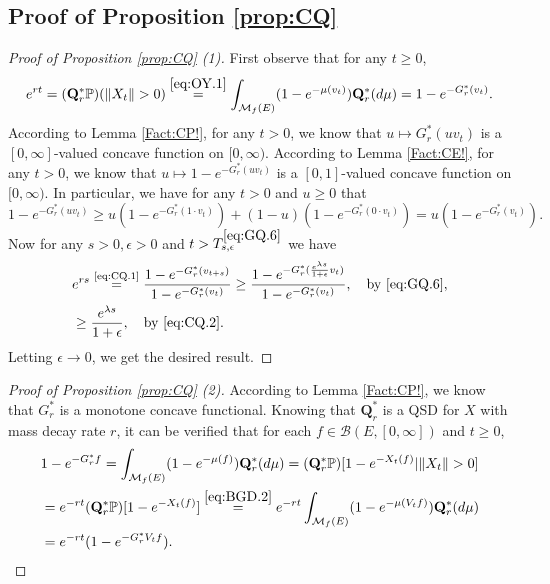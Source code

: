 \documentclass[12pt,a4paper]{amsart}
\numberwithin{equation}{section}
\theoremstyle{plain}
\theoremstyle{definition}
\theoremstyle{remark}
\begin{document}
\subsection{Proof of Proposition \ref{prop:CQ}} \label{sec:CQ}

\begin{proof}[Proof of Proposition \ref{prop:CQ} (1)]
	First observe that for any $t\geq 0$,
	\begin{equation} \label{eq:CQ.1}
	e^{rt} = (\mathbf Q_r^*\mathbb P)(\|X_t\|>0) 
	\overset{\eqref{eq:OY.1}}= \int_{\mathcal M_f(E)}  ( 1 - e^{-\mu(v_t)} ) \mathbf Q_r^*(d\mu)
	= 1 - e^{- G_r^*(v_t)}.
	\end{equation}
	According to Lemma \ref{Fact:CP!}, for any $t>0$, we know that $u\mapsto G_r^*(uv_t)$ is a $[0,\infty]$-valued concave function on $[0,\infty)$.
	According to Lemma \ref{Fact:CE!}, for any $t>0$, we know that $u \mapsto 1 - e^{- G_r^*(uv_t)}$ is a $[0,1]$-valued concave function on $[0, \infty)$.
	In particular, we have for any $t>0$ and $u \geq 0$ that
	\begin{equation} \label{eq:CQ.2}
		1 - e^{- G_r^*(uv_t)} \geq u(1 - e^{- G_r^*(1\cdot v_t)}) + (1-u) (1 - e^{- G_r^*(0 \cdot v_t)})  = u(1 - e^{- G_r^*(v_t)}).
	\end{equation}
	Now for any $s>0, \epsilon > 0$ and $t > T^{\eqref{eq:GQ.6}}_{s, \epsilon}$ we have
	\begin{align}
	& e^{rs} \overset{\text{\eqref{eq:CQ.1}}}= \frac{1 - e^{-G_r^*(v_{t+s})}}{1 - e^{-G_r^*(v_{t})}} \geq \frac{1 - e^{-G_r^*( \frac{e^{\lambda s}}{1+\epsilon}v_t )}}{1 - e^{-G_r^*(v_{t})}} ,\quad\text{by \eqref{eq:GQ.6}},
	\\&\geq \frac{e^{\lambda s}}{1+\epsilon},\quad\text{by \eqref{eq:CQ.2}}.
	\end{align}
	Letting $\epsilon \to 0$, we get the desired result.
\end{proof}

\begin{proof}[Proof of Proposition \ref{prop:CQ} (2)]
	According to Lemma \ref{Fact:CP!}, we know that $G_r^*$ is a monotone concave functional.
	Knowing that $\mathbf Q^*_r$ is a QSD for $X$ with mass decay rate $r$, it can be verified that for each $f\in \mathcal B(E,[0,\infty])$ and $t\geq 0$,
	\begin{align}
	&1 - e^{-G_r^*f} = \int_{\mathcal M_f(E)} (1-e^{-\mu(f)})\mathbf Q_r^*(d\mu)
	= (\mathbf Q_r^* \mathbb P) [1 - e^{-X_t(f)} |\|X_t\|>0]
	\\&= e^{-rt}(\mathbf Q_r^*\mathbb P)[1 - e^{- X_t(f)}]
	\overset{\eqref{eq:BGD.2}}= e^{-rt} \int_{\mathcal M_f(E)} (1 - e^{-\mu(V_tf)}) \mathbf Q_r^*(d\mu)
	\\&= e^{-rt} (1 - e^{-G_r^*V_tf}).
	\qedhere
	\end{align}
	
\end{proof}
\end{document}
